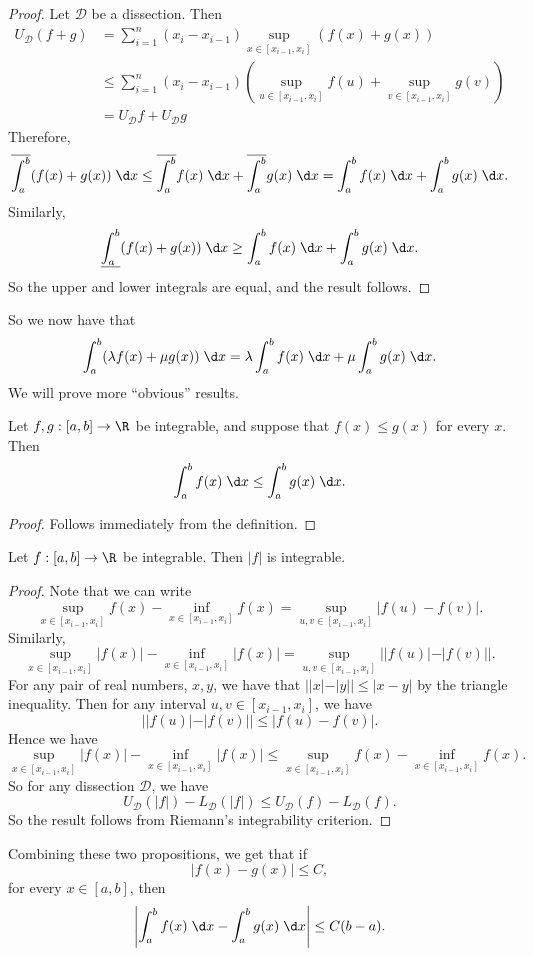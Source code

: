 \documentclass[a4paper]{article}
\begin{document}
\begin{proof}
  Let $\mathcal{D}$ be a dissection. Then
  \begin{align*}
    U_\mathcal{D}(f + g) &= \sum_{i = 1}^n (x_i - x_{i - 1})\sup_{x\in [x_{i - 1}, x_i]}(f(x) + g(x))\\
    &\leq \sum_{i = 1}^n (x_i - x_{i - 1}) \left(\sup_{u\in [x_{i - 1}, x_i]}f(u) + \sup_{v\in [x_{i - 1}, x_i]}g(v)\right)\\
    &= U_\mathcal{D}f + U_\mathcal{D} g
  \end{align*}
  Therefore,
  \[
    \overline{\int_a^b}(f(x) + g(x))\;\d x \leq \overline{\int_a^b} f(x)\;\d x + \overline{\int_a^b} g(x)\;\d x = \int_a^b f(x)\;\d x + \int_a^bg(x)\;\d x.
  \]
  Similarly,
  \[
  \underline{\int_a^b}(f(x) + g(x))\;\d x \geq \int_a^b f(x)\;\d x + \int_a^b g(x)\;\d x.
  \]
  So the upper and lower integrals are equal, and the result follows.
\end{proof}
So we now have that
\[
  \int_a^b (\lambda f(x) + \mu g(x))\;\d x = \lambda\int_a^b f(x)\;\d x + \mu\int_a^bg(x)\;\d x.
\]
We will prove more ``obvious'' results.
\begin{prop}
  Let $f, g: [a, b] \to \R$ be integrable, and suppose that $f(x) \leq g(x)$ for every $x$. Then
  \[
    \int_a^b f(x)\;\d x \leq \int_a^b g(x)\;\d x.
  \]
\end{prop}

\begin{proof}
  Follows immediately from the definition.
\end{proof}

\begin{prop}
  Let $f: [a, b] \to \R$ be integrable. Then $|f|$ is integrable.
\end{prop}

\begin{proof}
  Note that we can write
  \[
    \sup_{x\in [x_{i - 1}, x_i]}f(x) - \inf_{x\in [x_{i - 1}, x_i]}f(x) = \sup_{u, v\in [x_{i - 1}, x_i]}|f(u) - f(v)|.
  \]
  Similarly,
  \[
    \sup_{x\in [x_{i - 1}, x_i]}|f(x)| - \inf_{x\in [x_{i - 1}, x_i]}|f(x)| = \sup_{u, v\in [x_{i - 1}, x_i]}||f(u)| - |f(v)||.
  \]
  For any pair of real numbers, $x, y$, we have that $||x| - |y|| \leq |x - y|$ by the triangle inequality. Then for any interval $u, v\in [x_{i - 1}, x_i]$, we have
  \[
    ||f(u)| - |f(v)|| \leq |f(u) - f(v)|.
  \]
  Hence we have
  \[
    \sup_{x\in [x_{i - 1}, x_i]}|f(x)| - \inf_{x\in [x_{i - 1}, x_i]}|f(x)| \leq \sup_{x\in [x_{i - 1}, x_i]}f(x) - \inf_{x\in [x_{i - 1}, x_i]} f(x).
  \]
  So for any dissection $\mathcal{D}$, we have
  \[
    U_\mathcal{D} (|f|) - L_\mathcal{D}(|f|) \leq U_\mathcal{D}(f) - L_\mathcal{D}(f).
  \]
  So the result follows from Riemann's integrability criterion.
\end{proof}
Combining these two propositions, we get that if
\[
  |f(x) - g(x)| \leq C,
\]
for every $x\in[a, b]$, then
\[
  \left|\int_a^bf(x)\;\d x - \int_a^b g(x)\;\d x\right| \leq C(b - a).
\]
\end{document}
